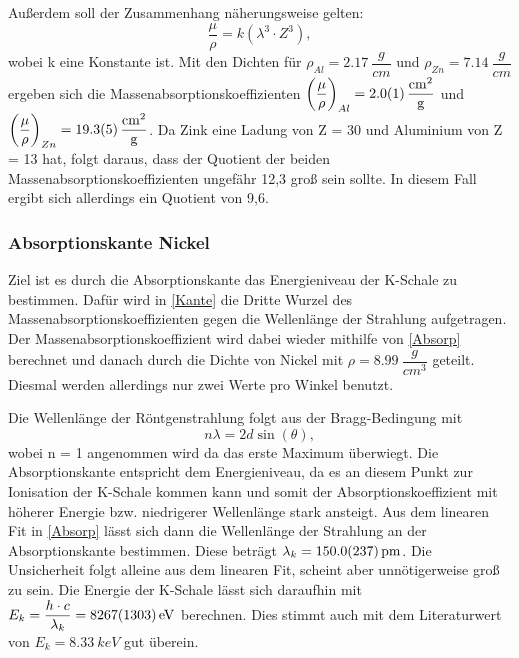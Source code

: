 \documentclass[
	a4paper,
	12pt,
	pagesize,
	ngerman
]{scrartcl}
\begin{document}
Außerdem soll der Zusammenhang näherungsweise gelten:
\begin{equation}
\dfrac{\mu}{\rho} = k(\lambda^{3} \cdot Z^{3}),
\label{Z}
\end{equation}
wobei k eine Konstante ist. Mit den Dichten für $\rho_{Al} = \SI{2,17}{\dfrac{g}{cm}}$ und $\rho_{Zn} = \SI{7,14}{\dfrac{g}{cm}}$ ergeben sich die Massenabsorptionskoeffizienten $\left(\dfrac{\mu}{\rho}\right)_{Al} = \SI{2,0 \pm 0,1}{\dfrac{cm^{2}}{g}}$ und $\left(\dfrac{\mu}{\rho}\right)_{Zn} = \SI{19,3 \pm 0,5}{\dfrac{cm^{2}}{g}}$. Da Zink eine Ladung von Z = 30 und Aluminium von Z = 13 hat, folgt daraus, dass der Quotient der beiden Massenabsorptionskoeffizienten ungefähr 12,3 groß sein sollte. In diesem Fall ergibt sich allerdings ein Quotient von 9,6.

\subsubsection{Absorptionskante Nickel}
\label{Ni}
Ziel ist es durch die Absorptionskante das Energieniveau der K-Schale zu bestimmen. Dafür wird in \cref{Kante} die Dritte Wurzel des Massenabsorptionskoeffizienten gegen die Wellenlänge der Strahlung aufgetragen. Der Massenabsorptionskoeffizient wird dabei wieder mithilfe von \cref{Absorp} berechnet und danach durch die Dichte von Nickel mit $\rho = \SI{8,99}{\dfrac{g}{cm^{3}}}$ geteilt. Diesmal werden allerdings nur zwei Werte pro Winkel benutzt.

Die Wellenlänge der Röntgenstrahlung folgt aus der Bragg-Bedingung mit
\begin{equation}
n \lambda = 2 d \sin(\theta),
\end{equation}
wobei n = 1 angenommen wird da das erste Maximum überwiegt. Die Absorptionskante entspricht dem Energieniveau, da es an diesem Punkt zur Ionisation der K-Schale kommen kann und somit der Absorptionskoeffizient mit höherer Energie bzw. niedrigerer Wellenlänge stark ansteigt. Aus dem linearen Fit in \cref{Absorp} lässt sich dann die Wellenlänge der Strahlung an der Absorptionskante bestimmen. Diese beträgt $\lambda_{k} = \SI{150,0 \pm 23,7}{pm}$. Die Unsicherheit folgt alleine aus dem linearen Fit, scheint aber unnötigerweise groß zu sein. Die Energie der K-Schale lässt sich daraufhin mit $E_{k} = \dfrac{h \cdot c}{\lambda_{k}} = \SI{8267 \pm 1303}{eV}$ berechnen. Dies stimmt auch mit dem Literaturwert von $E_{k} = \SI{8,33}{keV}$ gut überein.
\end{document}
